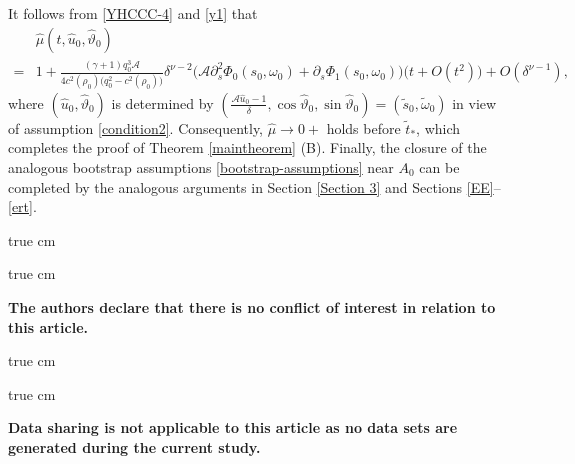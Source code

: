 \documentclass[11pt,twoside]{article}
\def\p{\partial}
\begin{document}
It follows from \eqref{YHCCC-4} and \eqref{y1} that
    \begin{equation}\label{YHCCC-5}
    \begin{split}
    &\hat\mu(t,\hat u_0,\hat\vartheta_0)\\
    = & 1 + \frac{(\gamma+1) q_0^3\mathcal A}{4c^2(\rho_0)\bigl(q_0^2 - c^2(\rho_0)\bigr)} \delta^{\nu-2} \bigl(\mathcal A\p_s^2\Phi_0(s_0,\omega_0)+\p_s\Phi_1(s_0, \omega_0)\bigr)
    \big(t+O(t^2)\big) + O(\delta^{\nu-1}),
    \end{split}
    \end{equation}
where \((\hat u_0, \hat\vartheta_0)\) is determined by
$(\frac{\mathcal A \hat u_0 - 1}{\delta}, \cos\hat\vartheta_0, \sin\hat\vartheta_0) = (\tilde s_0, \tilde\omega_0)$
in view of assumption \eqref{condition2}. Consequently, \(\hat\mu\to 0+\) holds before
$\tilde t_*$, which completes the proof of Theorem \ref{maintheorem} (B).
Finally, the closure of the analogous bootstrap assumptions \eqref{bootstrap-assumptions} near $A_0$
can be completed by the analogous arguments in Section \ref{Section 3} and Sections \ref{EE}--\ref{ert}.


 true cm

{\bf \color{blue}{Conflict of Interest Statement:}}

 true cm

{\bf The authors declare that there is no conflict of interest in relation to this article.}

 true cm
{\bf \color{blue}{Data availability statement:}}

 true cm

{\bf  Data sharing is not applicable to this article as no data sets are generated
during the current study.}
\end{document}
